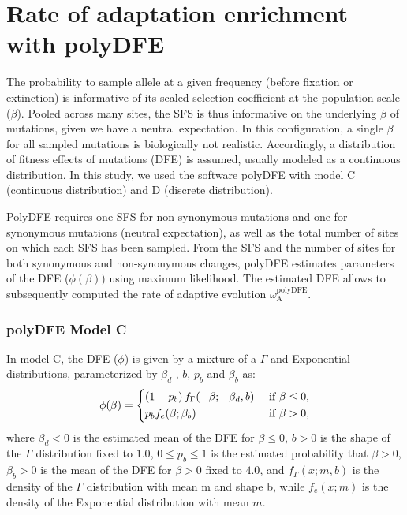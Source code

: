 \documentclass{article}
\newcommand{\rateApop}{\omega_{\mathrm{A}}}
\newcommand{\Spop}{\beta}
\begin{document}
    \pagebreak
    \section{Rate of adaptation enrichment with polyDFE}
    \label{sec:polyDFE}

    The probability to sample allele at a given frequency (before fixation or extinction) is informative of its scaled selection coefficient at the population scale ($\Spop$).
    Pooled across many sites, the SFS is thus informative on the underlying $\Spop$ of mutations, given we have a neutral expectation.
    In this configuration, a single $\Spop$ for all sampled mutations is biologically not realistic.
    Accordingly, a distribution of fitness effects of mutations (DFE) is assumed, usually modeled as a continuous distribution\cite{eyre-walker_distribution_2006, eyre-walker_estimating_2009}.
    In this study, we used the software polyDFE\cite{tataru_inference_2017, tataru_polydfe_2020} with model C (continuous distribution) and D (discrete distribution).

    PolyDFE requires one SFS for non-synonymous mutations and one for synonymous mutations (neutral expectation), as well as the total number of sites on which each SFS has been sampled.
    From the SFS and the number of sites for both synonymous and non-synonymous changes, polyDFE estimates parameters of the DFE ($\phi (\Spop)$) using maximum likelihood.
    The estimated DFE allows to subsequently computed the rate of adaptive evolution $\rateApop^{\mathrm{polyDFE}}$.

    \subsubsection*{polyDFE Model C}
    In model C, the DFE ($\phi$) is given by a mixture of a $\Gamma$ and Exponential distributions, parameterized by $\Spop_d$ , $b$, $p_b$
    and $\Spop_b$ as:
    \begin{equation}
        \phi (\Spop) =
        \begin{dcases}
            \left( 1 - p_b \right) f_{\Gamma}(-\Spop; -\Spop_d, b) & \text{ if $\Spop \leq 0$,} \\
            p_b f_{e}(\Spop; \Spop_b) & \text{ if $\Spop > 0$,} \\
        \end{dcases}
    \end{equation}
    where $\Spop_d < 0 $ is the estimated mean of the DFE for $\Spop \leq 0$,
    $b > 0$ is the shape of the $\Gamma$ distribution fixed to $1.0$,
    $0 \leq p_b \leq 1$ is the estimated probability that $\Spop > 0$,
    $\Spop_b > 0$ is the mean of the DFE for $\Spop > 0$ fixed to $4.0$,
    and $f_{\Gamma}(x; m, b)$ is the density of the $\Gamma$ distribution with mean m and shape b, while $f_{e}(x; m)$ is the density of the Exponential distribution with mean $m$.
\end{document}
